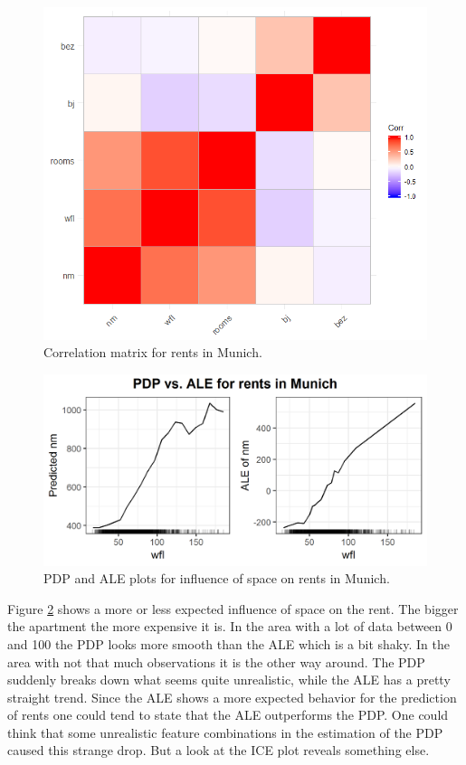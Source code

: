 \documentclass[
]{krantz}
\begin{document}
\begin{figure}
\includegraphics[width=1\linewidth]{images/ale_1_correlation_munich_rents} \caption{Correlation matrix for rents in Munich.}\label{fig:correlationMatrixRents}
\end{figure}



\begin{figure}
\includegraphics[width=1\linewidth]{images/ale_1_rf_rent_for_rooms_and_wfl} \caption{PDP and ALE plots for influence of space on rents in Munich.}\label{fig:pdpaleRents}
\end{figure}



Figure \ref{fig:pdpaleRents} shows a more or less expected influence of space on the rent. The bigger the apartment the more expensive it is. In the area with a lot of data between 0 and 100 the PDP looks more smooth than the ALE which is a bit shaky. In the area with not that much observations it is the other way around. The PDP suddenly breaks down what seems quite unrealistic, while the ALE has a pretty straight trend. Since the ALE shows a more expected behavior for the prediction of rents one could tend to state that the ALE outperforms the PDP. One could think that some unrealistic feature combinations in the estimation of the PDP caused this strange drop. But a look at the ICE plot reveals something else.
\end{document}
